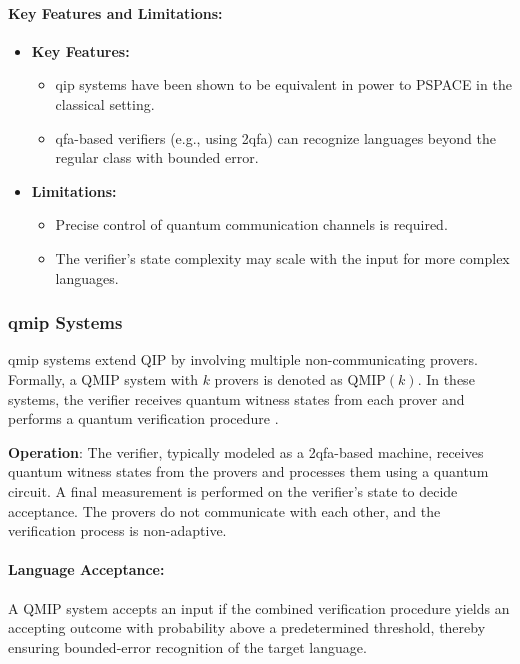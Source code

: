 \paragraph{Key Features and Limitations:}
\begin{itemize}
    \item \textbf{Key Features:}
    \begin{itemize}
        \item \gls{qip} systems have been shown to be equivalent in power to PSPACE in the classical setting.
        \item \gls{qfa}-based verifiers (e.g., using \gls{2qfa}) can recognize languages beyond the regular class with bounded error.
    \end{itemize}
    \item \textbf{Limitations:}
    \begin{itemize}
        \item Precise control of quantum communication channels is required.
        \item The verifier’s state complexity may scale with the input for more complex languages.
    \end{itemize}
\end{itemize}

\subsubsection{\gls{qmip} Systems}
\label{sssec:qmip}
\begin{definition}
    \gls{qmip} systems extend QIP by involving multiple non-communicating provers. Formally, a QMIP system with \( k \) provers is denoted as \(\text{QMIP}(k)\). In these systems, the verifier receives quantum witness states from each prover and performs a quantum verification procedure \cite{scegulnaja2010postselection, yamakami2014constant}.
\end{definition}

\textbf{Operation}:  
The verifier, typically modeled as a \gls{2qfa}-based machine, receives quantum witness states from the provers and processes them using a quantum circuit. A final measurement is performed on the verifier’s state to decide acceptance. The provers do not communicate with each other, and the verification process is non-adaptive.

\paragraph{Language Acceptance:}  
A QMIP system accepts an input if the combined verification procedure yields an accepting outcome with probability above a predetermined threshold, thereby ensuring bounded-error recognition of the target language.

